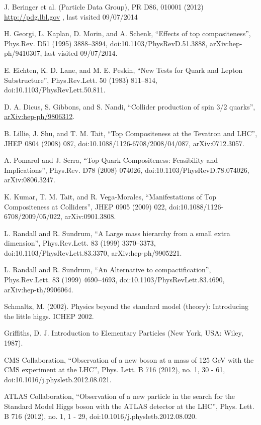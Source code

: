 \documentclass[12pt,oneandhalf,chaparabic,phys,ms,eng]{metu}
\begin{document}
\begin{thebibliography}{99}\fontsize{12}{16.4} \selectfont

	J. Beringer et al. (Particle Data Group), PR D86, 010001 (2012) \url{http://pdg.lbl.gov} , last visited 09/07/2014

	H. Georgi, L. Kaplan, D. Morin, and A. Schenk, “Effects of top compositeness”, Phys.Rev. D51 (1995) 3888–3894, doi:10.1103/PhysRevD.51.3888, arXiv:hep-ph/9410307, last visited 09/07/2014.

	E. Eichten, K. D. Lane, and M. E. Peskin, “New Tests for Quark and Lepton Substructure”, Phys.Rev.Lett. 50 (1983) 811–814, doi:10.1103/PhysRevLett.50.811.

	D. A. Dicus, S. Gibbons, and S. Nandi, “Collider production of spin 3/2 quarks”, \url{arXiv:hep-ph/9806312}.

	B. Lillie, J. Shu, and T. M. Tait, “Top Compositeness at the Tevatron and LHC”, JHEP 0804 (2008) 087, doi:10.1088/1126-6708/2008/04/087, arXiv:0712.3057.

	A. Pomarol and J. Serra, “Top Quark Compositeness: Feasibility and Implications”, Phys.Rev. D78 (2008) 074026, doi:10.1103/PhysRevD.78.074026, arXiv:0806.3247.

	K. Kumar, T. M. Tait, and R. Vega-Morales, “Manifestations of Top Compositeness at Colliders”, JHEP 0905 (2009) 022, doi:10.1088/1126-6708/2009/05/022, arXiv:0901.3808.

	L. Randall and R. Sundrum, “A Large mass hierarchy from a small extra dimension”, Phys.Rev.Lett. 83 (1999) 3370–3373, doi:10.1103/PhysRevLett.83.3370, arXiv:hep-ph/9905221.

	L. Randall and R. Sundrum, “An Alternative to compactification”, Phys.Rev.Lett. 83 (1999) 4690–4693, doi:10.1103/PhysRevLett.83.4690, arXiv:hep-th/9906064.

	Schmaltz, M. (2002). Physics beyond the standard model (theory): Introducing the little higgs. ICHEP 2002.

	Griffiths, D. J. Introduction to Elementary Particles (New York, USA: Wiley, 1987).

	CMS Collaboration, “Observation of a new boson at a mass of 125 GeV with the CMS experiment at the LHC”, Phys. Lett. B 716 (2012), no. 1, 30 - 61, doi:10.1016/j.physletb.2012.08.021.

	ATLAS Collaboration, “Observation of a new particle in the search for the Standard Model Higgs boson with the ATLAS detector at the LHC”, Phys. Lett. B 716 (2012), no. 1, 1 - 29, doi:10.1016/j.physletb.2012.08.020.


\end{thebibliography}
\end{document}
